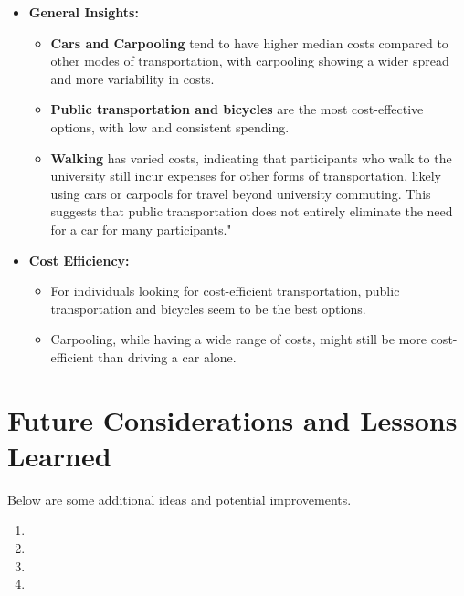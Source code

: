 \begin{itemize}
    \item \textbf{General Insights:}
    \begin{itemize}
        \item \textbf{Cars and Carpooling} tend to have higher median costs compared to other modes of transportation, with carpooling showing a wider spread and more variability in costs.
        \item \textbf{Public transportation and bicycles} are the most cost-effective options, with low and consistent spending.
        \item \textbf{Walking} has varied costs, indicating that participants who walk to the university still incur expenses for other forms of transportation, likely using cars or carpools for travel beyond university commuting. This suggests that public transportation does not entirely eliminate the need for a car for many participants."

    \end{itemize}

    \item \textbf{Cost Efficiency:}
    \begin{itemize}
        \item For individuals looking for cost-efficient transportation, public transportation and bicycles seem to be the best options.
        \item Carpooling, while having a wide range of costs, might still be more cost-efficient than driving a car alone.
    \end{itemize}
\end{itemize}

\chapter{Future Considerations and Lessons Learned}
\label{FutureConsiderations}
Below are some additional ideas and potential improvements. 
\begin{enumerate}
    \item {}
    \item {}
    \item {}
    \item {}
    
\end{enumerate}